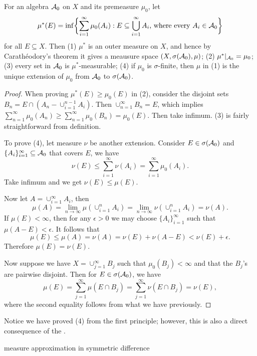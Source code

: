 \begin{namedthm} \label{thm:Caratheodory-ext}
    For an algebra $\mathcal{A}_{0}$ on $X$ and its premeasure
$\mu_{0}$, let 
\[
\mu^{*}(E)=\inf\biggl\{\sum_{i=1}^{\infty}\mu_{0}(A_{i}):E\subseteq\bigcup_{i=1}^{\infty}A_{i}\text{, where every }A_{i}\in\mathcal{A}_{0}\biggr\}
\]
for all $E\subseteq X$. Then (1) $\mu^{*}$ is an outer measure on $X$, and hence by Carathéodory's theorem it gives a meausure space
$(X,\sigma(\mathcal{A}_{0}),\mu)$; (2) $\mu^{*}|_{\mathcal{A}_{0}}=\mu_{0}$; (3) every
set in $\mathcal{A}_{0}$ is $\mu^{*}$-measurable; (4) if $\mu_{0}$ is $\sigma$-finite,
then $\mu$ in (1) is the unique extension of $\mu_{0}$ from $\mathcal{A}_{0}$
to $\sigma(\mathcal{A}_{0})$.
\end{namedthm}

\begin{proof}
When proving $\mu^{*}(E)\geq\mu_{0}(E)$ in (2), consider the disjoint
sets $B_{n}=E\cap(A_{n}-\cup_{i=1}^{n-1}A_{i})$. Then $\cup_{n=1}^{\infty}B_{n}=E$,
which implies $\sum_{n=1}^{\infty}\mu_{0}(A_{n})\geq\sum_{n=1}^{\infty}\mu_{0}(B_{n})=\mu_{0}(E)$.
Then take infimum. (3) is fairly straightforward from definition.

To prove (4), let measure $\nu$ be another extension. Consider $E\in\sigma(\mathcal{A}_{0})$
and $\{A_{i}\}_{i=1}^{\infty}\subseteq\mathcal{A}_{0}$ that covers $E$, we
have 
\[
\nu(E)\leq\sum_{i=1}^{\infty}\nu(A_{i})=\sum_{i=1}^{\infty}\mu_{0}(A_{i}).
\]
Take infimum and we get $\nu(E)\leq\mu(E)$.

Now let $A=\cup_{i=1}^{\infty}A_{i}$, then 
\[
\mu(A)=\lim_{n\to\infty}\mu(\cup_{i=1}^{n}A_{i})=\lim_{n\to\infty}\nu(\cup_{i=1}^{n}A_{i})=\nu(A).
\]
If $\mu(E)<\infty$, then for any $\epsilon>0$ we may choose $\{A_{i}\}_{i=1}^{\infty}$
such that $\mu(A-E)<\epsilon$. It follows that 
\[
\mu(E)\leq\mu(A)=\nu(A)=\nu(E)+\nu(A-E)<\nu(E)+\epsilon.
\]
 Therefore $\mu(E)=\nu(E)$.

Now suppose we have $X=\cup_{j=1}^{\infty}B_{j}$ such that $\mu_{0}(B_{j})<\infty$
and that the $B_{j}$'s are pairwise disjoint. Then for $E\in\sigma(\mathcal{A}_{0})$,
we have 
\[
\mu(E)=\sum_{j=1}^{\infty}\mu(E\cap B_{j})=\sum_{j=1}^{\infty}\nu(E\cap B_{j})=\nu(E),
\]
where the second equality follows from what we have previously.
\end{proof}

Notice we have proved (4) from the first principle; however, this is also a direct consequence of the .

measure approximation in symmetric difference
\begin{thm}
    
\end{thm}

